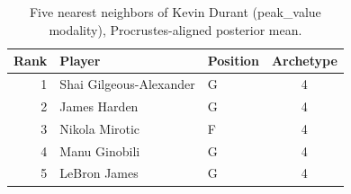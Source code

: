 \begin{table}[htbp]
  \centering\small
  \begin{tabular}{rllc}
    \toprule
    Rank & Player & Position & Archetype \\
    \midrule
    1 & Shai Gilgeous-Alexander & G & 4 \\
    2 & James Harden & G & 4 \\
    3 & Nikola Mirotic & F & 4 \\
    4 & Manu Ginobili & G & 4 \\
    5 & LeBron James & G & 4 \\
    \bottomrule
  \end{tabular}
  \caption{Five nearest neighbors of Kevin Durant (peak_value modality), Procrustes-aligned posterior mean.}
  \label{tab:Kevin_Durant_neighbors_peak_value}
\end{table}

